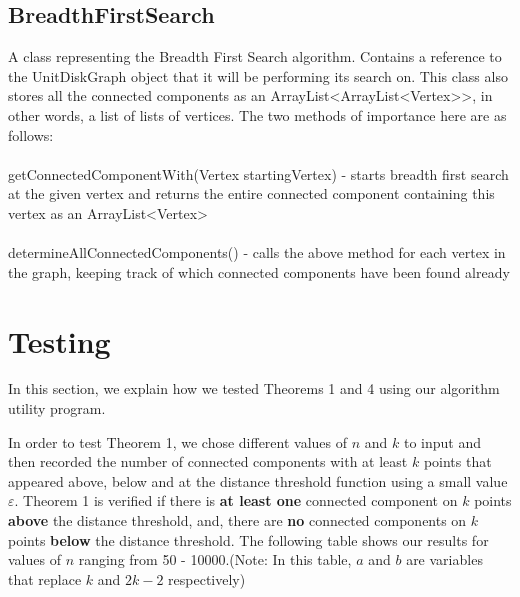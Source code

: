 \documentclass{article}
\begin{document}
\subsection*{BreadthFirstSearch}
A class representing the Breadth First Search algorithm. Contains a reference to the UnitDiskGraph object that it will be performing its search on. This class also stores all the connected components as an ArrayList\textless ArrayList\textless Vertex\textgreater\textgreater, in other words, a list of lists of vertices. The two methods of importance here are as follows:\\ \\
getConnectedComponentWith(Vertex startingVertex) - starts breadth first search at the given vertex and returns the entire connected component containing this vertex as an ArrayList\textless Vertex\textgreater \\ \\
determineAllConnectedComponents() - calls the above method for each vertex in the graph, keeping track of which connected components have been found already


\section{Testing}
In this section, we explain how we tested Theorems 1 and 4 using our algorithm utility program.

In order to test Theorem 1, we chose different values of $n$ and $k$ to input and then recorded the number of connected components with at least $k$ points that appeared above, below and at the distance threshold function using a small value $\varepsilon$. Theorem 1 is verified if there is \textbf{at least one} connected component on $k$ points \textbf{above} the distance threshold, and, there are \textbf{no} connected components on $k$ points \textbf{below} the distance threshold. The following table shows our results for values of $n$ ranging from 50 - 10000.(Note: In this table, $a$ and $b$ are variables that replace $k$ and $2k-2$ respectively)
\end{document}
